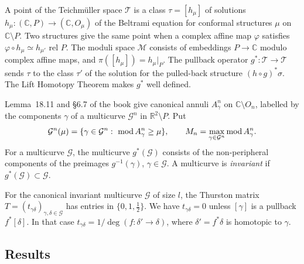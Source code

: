 \begin{definition}
\label{def:lyubich-teichmuller}
A point of the Teichm\"uller space $\mathcal T$ is a class $\tau=[h_\mu]$ of solutions
$h_\mu\colon(\mathbb C,P)\to(\mathbb C,O_\mu)$ of the Beltrami equation for conformal structures $\mu$ on
$\mathbb C\setminus P$.  Two structures give the same point when a complex affine map $\varphi$ satisfies
$\varphi\circ h_\mu\simeq h_{\mu'}$ rel $P$.  The moduli space $\mathcal M$ consists of embeddings
$P\to\mathbb C$ modulo complex affine maps, and $\pi([h_\mu])=h_\mu|_P$.  The pullback operator
$g^*\colon\mathcal T\to\mathcal T$ sends $\tau$ to the class $\tau'$ of the solution for the pulled-back
structure $(h\circ g)^*\sigma$.  The Lift Homotopy Theorem makes $g^*$ well defined.
\end{definition}

\begin{definition}
\label{def:lyubich-canonical-annuli}
Lemma~18.11 and \S6.7 of the book give canonical annuli $A^n_\gamma$ on $\mathbb C\setminus O_n$, labelled by
the components $\gamma$ of a multicurve $\mathcal G^n$ in $\mathbb R^2\setminus P$.  Put
\[
 \mathcal G^n(\mu)=\{\gamma\in\mathcal G^n:\ \operatorname{mod} A^n_\gamma\ge\mu\},
 \qquad
 M_n=\max_{\gamma\in\mathcal G^n}\operatorname{mod} A^n_\gamma .
\]
For a multicurve $\mathcal G$, the multicurve $g^*(\mathcal G)$ consists of the non-peripheral components of
the preimages $g^{-1}(\gamma)$, $\gamma\in\mathcal G$.  A multicurve is \emph{invariant} if
$g^*(\mathcal G)\subset\mathcal G$.
\end{definition}

\begin{definition}
\label{def:lyubich-thurston-matrix}
For the canonical invariant multicurve $\mathcal G$ of size $l$, the Thurston matrix
$T=(t_{\gamma\delta})_{\gamma,\delta\in\mathcal G}$ has entries in $\{0,1,\tfrac12\}$.  We have
$t_{\gamma\delta}=0$ unless $[\gamma]$ is a pullback $f^*[\delta]$.  In that case
$t_{\gamma\delta}=1/\deg(f\colon\delta'\to\delta)$, where $\delta'=f^*\delta$ is homotopic to $\gamma$.
\end{definition}

\subsection*{Results}

